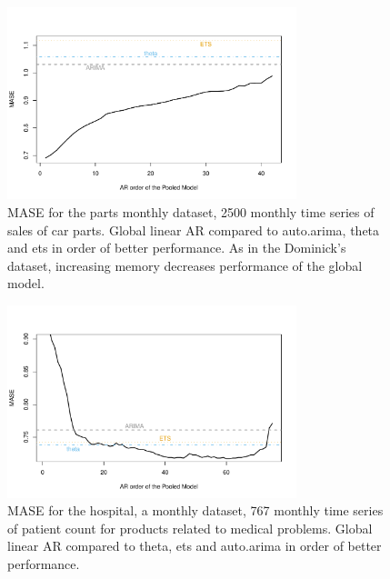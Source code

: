 \documentclass[a4paper]{article}
\theoremstyle{custom}
\begin{document}
\begin{figure}
  \centering
  \includegraphics[width=0.75\textwidth]{fig/parts.pdf}
  \caption{MASE for the parts monthly dataset, 2500 monthly time series of sales of car parts. Global linear AR compared to auto.arima, theta and ets in order of better performance. As in the Dominick's dataset, increasing memory decreases performance of the global model.}
  \label{fig:parts}
\end{figure}

\begin{figure}
  \centering
  \includegraphics[width=0.75\textwidth]{fig/hospital.pdf}
  \caption{MASE for the hospital, a monthly dataset, 767 monthly time series of patient count for products related to medical problems. Global linear AR compared to theta, ets and auto.arima in order of better performance.}
  \label{fig:hospital}
\end{figure}
\end{document}

